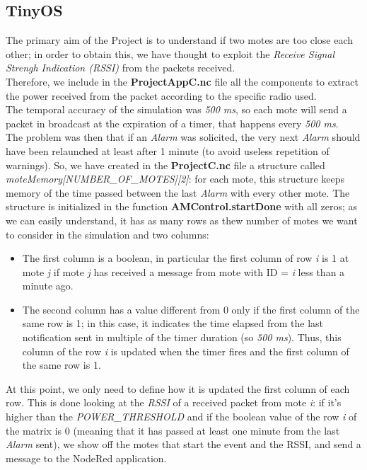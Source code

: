 
\subsection{TinyOS}
The primary aim of the Project is to understand if two motes are too close each other; 
in order to obtain this, we have thought to exploit the \textit{Receive Signal Strengh Indication (RSSI)}
from the packets received. \\
Therefore, we include in the \textbf{ProjectAppC.nc} file all the components to extract the power received 
from the packet according to the specific radio used. \\
The temporal accuracy of the simulation was \textit{500 ms}, so each mote will send a packet in broadcast 
at the expiration of a timer, that happens every \textit{500 ms}.\\
The problem was then that if an \textit{Alarm} was solicited, the very next \textit{Alarm} should have been
relaunched at least after 1 minute (to avoid useless repetition of warnings).
So, we have created in the \textbf{ProjectC.nc} file a structure called \textit{moteMemory[NUMBER\_OF\_MOTES][2]}: for each mote, 
this structure keeps memory of the time passed between the last \textit{Alarm} with every other mote. 
The structure is initialized in the function \textbf{AMControl.startDone} with all zeros; as we can easily understand, it has as
many rows as thew number of motes we want to consider in the simulation and two columns:
\begin{itemize}
    \item The first column is a boolean, in particular the first column of row \textit{i} is 1 at mote \textit{j} if mote 
            \textit{j} has received a message from mote with ID = \textit{i} less than a minute ago.
    \item The second column has a value different from 0 only if the first column of the same row is 1; in this case, it indicates
            the time elapsed from the last notification sent in multiple of the timer duration (so \textit{500 ms}). Thus, this
            column of the row \textit{i} is updated when the timer fires and the first column of the same row is 1.
\end{itemize}
At this point, we only need to define how it is updated the first column of each row. This is done looking at the \textit{RSSI} of 
a received packet from mote \textit{i}: if it's higher than the \textit{POWER\_THRESHOLD} and if the boolean value of the row
\textit{i} of the matrix is 0 (meaning that it has passed at least one minute from the last \textit{Alarm} sent), we show off the
motes that start the event and the RSSI, and send a message to the NodeRed application.


